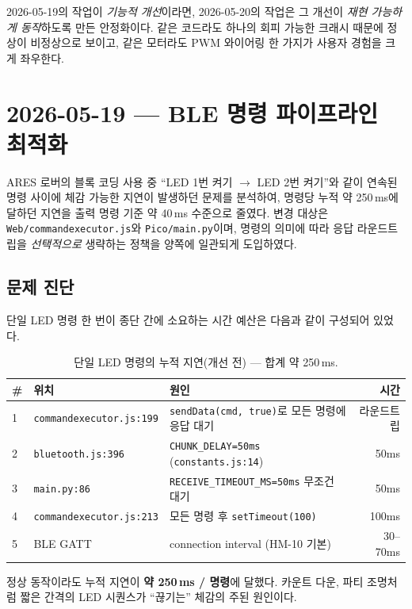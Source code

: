\documentclass[11pt, oneside]{article}
\begin{document}
\begin{keypoint}
2026-05-19의 작업이 \emph{기능적 개선}이라면, 2026-05-20의 작업은 그
개선이 \emph{재현 가능하게 동작}하도록 만든 안정화이다. 같은 코드라도
하나의 회피 가능한 크래시 때문에 정상이 비정상으로 보이고, 같은 모터라도
PWM 와이어링 한 가지가 사용자 경험을 크게 좌우한다.
\end{keypoint}

\section{2026-05-19 --- BLE 명령 파이프라인 최적화}

ARES 로버의 블록 코딩 사용 중 ``LED 1번 켜기 $\rightarrow$ LED 2번 켜기''와 같이
연속된 명령 사이에 체감 가능한 지연이 발생하던 문제를 분석하여, 명령당
누적 약 250\,ms에 달하던 지연을 출력 명령 기준 약 40\,ms 수준으로 줄였다.
변경 대상은 \texttt{Web/commandexecutor.js}와 \texttt{Pico/main.py}이며,
명령의 의미에 따라 응답 라운드트립을 \emph{선택적으로} 생략하는 정책을
양쪽에 일관되게 도입하였다.

\subsection{문제 진단}

단일 LED 명령 한 번이 종단 간에 소요하는 시간 예산은 다음과 같이
구성되어 있었다.

\begin{table}[h]
\centering
\small
\begin{tabularx}{\linewidth}{@{}llXr@{}}
\toprule
\# & 위치 & 원인 & 시간 \\
\midrule
1 & \texttt{commandexecutor.js:199} & \texttt{sendData(cmd, true)}로 모든 명령에 응답 대기 & 라운드트립 \\
2 & \texttt{bluetooth.js:396} & \texttt{CHUNK\_DELAY=50ms} (\texttt{constants.js:14}) & 50ms \\
3 & \texttt{main.py:86} & \texttt{RECEIVE\_TIMEOUT\_MS=50ms} 무조건 대기 & 50ms \\
4 & \texttt{commandexecutor.js:213} & 모든 명령 후 \texttt{setTimeout(100)} & 100ms \\
5 & BLE GATT  & connection interval (HM-10 기본) & 30--70ms \\
\bottomrule
\end{tabularx}
\caption{단일 LED 명령의 누적 지연(개선 전) --- 합계 약 250\,ms.}
\end{table}

\begin{keypoint}
정상 동작이라도 누적 지연이 \textbf{약 250\,ms / 명령}에 달했다. 카운트
다운, 파티 조명처럼 짧은 간격의 LED 시퀀스가 ``끊기는'' 체감의 주된
원인이다.
\end{keypoint}
\end{document}
